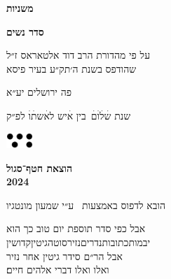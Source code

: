\documentclass[14pt, a5paper, twoside, extrafontsizes]{memoir}
\begin{document}
\frontmatter
\pagestyle{myheadings}
\thispagestyle{mytitlepage}
\begin{hebrew}
{\Centering

  {\huge\bfseries משניות}

  {\LARGE\bfseries סדר נשים}

  \vspace{1em}

  \vspace{0.5em}
  על פי מהדורת הרב דוד אלטאראס ז״ל\\שהודפס בשנת ה׳תק״ע בעיר פיסא

    \vspace{8em}
    פה {\LARGE ירושלים} יע״א

    {\small שנת}
    {\Large שׄלׄוׄםׄ}\ בין {\Large אׄ}יש ל{\Large אׄ}ש{\Large תׄוׄ}
    {\small לפ״ק}

    \vspace{2em}
  \includegraphics[width=10mm]{hatafSegolLogoNoText.png}\\

    \vspace{.5em}
  {
    \bfseries הוצאת חטף־סגול\\2024

 {\footnotesize  הובא לדפוס באמצעות \XeLaTeX\ ע״י שמעון מונטגיו}

  }

}


\vspace{1em}
{
\parskip 2pt


\vspace{4pt}
       { \centering
         \small
  {\larger  אבל} כפי סדר תוספת יום טוב כך הוא\\
  יבמות\hdot כתובות\hdot נדרים\hdot נזיר\hdot סוטה\hdot גיטין\hdot קדושין\\
  אבל הר״ם סידר גיטין אחר נזיר\\
  ואלו ואלו דברי אלהים חיים׃}

}
\mainmatter
\thispagestyle{empty}










%
%

\end{hebrew}
\end{document}
